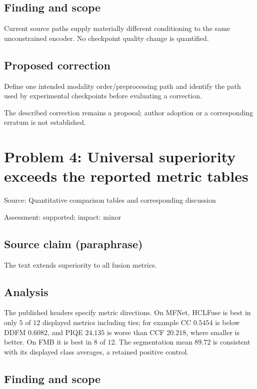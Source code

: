 \documentclass[11pt]{article}
\begin{document}
\subsection*{Finding and scope}

Current source paths supply materially different conditioning to the same unconstrained encoder. No checkpoint quality change is quantified.

\subsection*{Proposed correction}

Define one intended modality order/preprocessing path and identify the path used by experimental checkpoints before evaluating a correction.

The described correction remains a proposal; author adoption or a corresponding erratum is not established.

\section*{Problem 4: Universal superiority exceeds the reported metric tables}

Source: Quantitative comparison tables and corresponding discussion

Assessment: supported; impact: minor

\subsection*{Source claim (paraphrase)}

The text extends superiority to all fusion metrics.

\subsection*{Analysis}

The published headers specify metric directions. On MFNet, HCLFuse is best in only \(5\) of \(12\) displayed metrics including ties; for example CC \(0.5454\) is below DDFM \(0.6082\), and PIQE \(24.135\) is worse than CCF \(20.218\), where smaller is better. On FMB it is best in \(8\) of \(12\). The segmentation mean \(89.72\) is consistent with its displayed class averages, a retained positive control.

\subsection*{Finding and scope}
\end{document}
